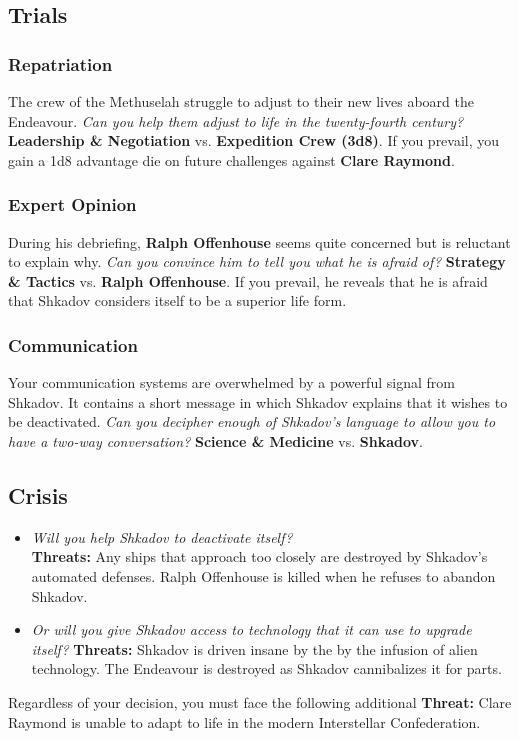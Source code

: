 \documentclass[11pt, a5paper, parskip=half-, DIV=12]{scrartcl}
\begin{document}
\subsection*{Trials}
\subsubsection*{Repatriation}
The crew of the Methuselah struggle to adjust to their new lives aboard the Endeavour. \textit{Can you help them adjust to life in the twenty-fourth century?} \textbf{Leadership \& Negotiation} vs. \textbf{Expedition Crew (3d8)}. If you prevail, you gain a 1d8 advantage die on future challenges against \textbf{Clare Raymond}.

\subsubsection*{Expert Opinion}
During his debriefing, \textbf{Ralph Offenhouse} seems quite concerned but is reluctant to explain why. \textit{Can you convince him to tell you what he is afraid of?} \textbf{Strategy \& Tactics} vs. \textbf{Ralph Offenhouse}. If you prevail, he reveals that he is afraid that Shkadov considers itself to be a superior life form.

\subsubsection*{Communication}
Your communication systems are overwhelmed by a powerful signal from Shkadov. It contains a short message in which Shkadov explains that it wishes to be deactivated. \textit{Can you decipher enough of Shkadov's language to allow you to have a two-way conversation?} \textbf{Science \& Medicine} vs. \textbf{Shkadov}.

\subsection*{Crisis}

\begin{itemize}
	\item \textit{Will you help Shkadov to deactivate itself?} \\ \textbf{Threats:}  Any ships that approach too closely are destroyed by Shkadov's automated defenses. Ralph Offenhouse is killed when he refuses to abandon Shkadov.
	\item \textit{Or will you give Shkadov access to technology that it can use to upgrade itself?} \textbf{Threats:} Shkadov is driven insane by the by the infusion of alien technology. The Endeavour is destroyed as Shkadov cannibalizes it for parts.
\end{itemize}
Regardless of your decision, you must face the following additional \textbf{Threat:} Clare Raymond is unable to adapt to life in the modern Interstellar Confederation.
\end{document}

